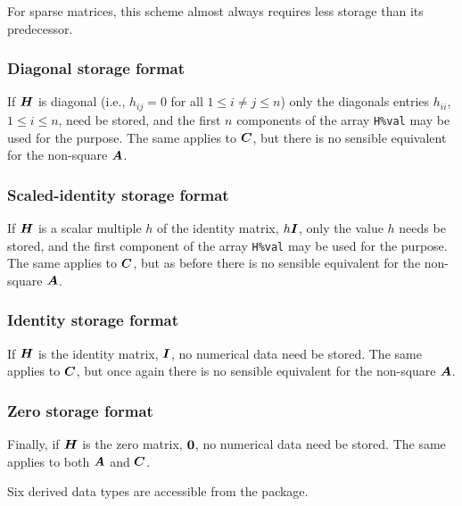 \documentclass{galahad}
\begin{document}
For sparse matrices, this scheme almost always requires less storage than
its predecessor.

\subsubsection{Diagonal storage format}\label{diagonal}
If ${\bm{H}}$ is diagonal (i.e., $h_{ij} = 0$ for all $1 \leq i \neq j \leq n$)
only the diagonals entries $h_{ii}$, $1 \leq i \leq n$,  need be stored,
and the first $n$ components of the array {\tt H\%val} may be used for
the purpose. The same applies to ${\bm{C}}$, but
there is no sensible equivalent for the non-square ${\bm{A}}$.

\subsubsection{Scaled-identity storage format}\label{scaled}
If ${\bm{H}}$ is a scalar multiple $h$ of the identity matrix, $h {\bm{I}}$,
only the value $h$ needs be stored,
and the first component of the array {\tt H\%val}
 may be used for
the purpose. The same applies to ${\bm{C}}$, but
as before there is no sensible equivalent for the non-square ${\bm{A}}$.

\subsubsection{Identity storage format}\label{identity}
If ${\bm{H}}$ is the identity matrix, ${\bm{I}}$,
no numerical data need be stored. The same applies to ${\bm{C}}$, but
once again there is no sensible equivalent for the non-square ${\bm{A}}$.

\subsubsection{Zero storage format}\label{zero}
Finally, if ${\bm{H}}$ is the zero matrix, ${\bm{0}}$,
no numerical data need be stored. The same applies to both ${\bm{A}}$ and ${\bm{C}}$.








\galtypes
Six derived data types are accessible from the package.
\end{document}
